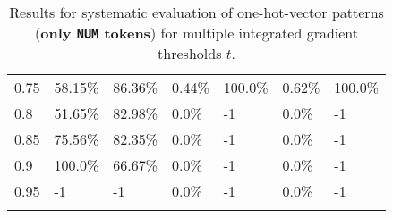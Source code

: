 \begin{table}[t]
\begin{tabular}{lllllll}
\multicolumn{1}{l|}{0.75}&  58.15\% & \multicolumn{1}{l|}{86.36\%}& 0.44\% & \multicolumn{1}{l|}{100.0\%}& 0.62\% & 100.0\%\\ 
\multicolumn{1}{l|}{0.8}&  51.65\% & \multicolumn{1}{l|}{82.98\%}& 0.0\% & \multicolumn{1}{l|}{-1}& 0.0\% & -1\\ 
\multicolumn{1}{l|}{0.85}&  75.56\% & \multicolumn{1}{l|}{82.35\%}& 0.0\% & \multicolumn{1}{l|}{-1}& 0.0\% & -1\\ 
\multicolumn{1}{l|}{0.9}&  100.0\% & \multicolumn{1}{l|}{66.67\%}& 0.0\% & \multicolumn{1}{l|}{-1}& 0.0\% & -1\\ 
\multicolumn{1}{l|}{0.95}&  -1 & \multicolumn{1}{l|}{-1}& 0.0\% & \multicolumn{1}{l|}{-1}& 0.0\% & -1\\ 


\\ \hline
\end{tabular}
\caption[Model Evaluation for only \texttt{NUM} tokens]{Results for systematic evaluation of one-hot-vector patterns (\textbf{only \texttt{NUM} tokens}) for multiple integrated gradient thresholds $t$.}
\label{tab:evalResultsNUM}
\end{table}
	
